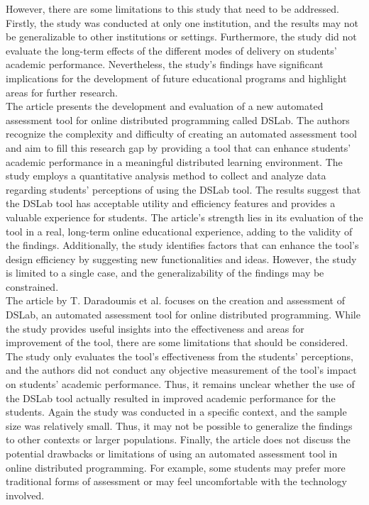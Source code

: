 However, there are some limitations to this study that need to be addressed. Firstly, the study was conducted at only one institution, and the results may not be generalizable to other institutions or settings. Furthermore, the study did not evaluate the long-term effects of the different modes of delivery on students' academic performance. Nevertheless, the study's findings have significant implications for the development of future educational programs and highlight areas for further research. \cite{fadol2018comparative}\\

The article presents the development and evaluation of a new automated assessment tool for online distributed programming called DSLab. The authors recognize the complexity and difficulty of creating an automated assessment tool and aim to fill this research gap by providing a tool that can enhance students' academic performance in a meaningful distributed learning environment. The study employs a quantitative analysis method to collect and analyze data regarding students' perceptions of using the DSLab tool. The results suggest that the DSLab tool has acceptable utility and efficiency features and provides a valuable experience for students. The article's strength lies in its evaluation of the tool in a real, long-term online educational experience, adding to the validity of the findings. Additionally, the study identifies factors that can enhance the tool's design efficiency by suggesting new functionalities and ideas. However, the study is limited to a single case, and the generalizability of the findings may be constrained.\\

The article by T. Daradoumis et al. focuses on the creation and assessment of DSLab, an automated assessment tool for online distributed programming. While the study provides useful insights into the effectiveness and areas for improvement of the tool, there are some limitations that should be considered. The study only evaluates the tool's effectiveness from the students' perceptions, and the authors did not conduct any objective measurement of the tool's impact on students' academic performance. Thus, it remains unclear whether the use of the DSLab tool actually resulted in improved academic performance for the students. Again the study was conducted in a specific context, and the sample size was relatively small. Thus, it may not be possible to generalize the findings to other contexts or larger populations. Finally, the article does not discuss the potential drawbacks or limitations of using an automated assessment tool in online distributed programming. For example, some students may prefer more traditional forms of assessment or may feel uncomfortable with the technology involved.\cite{daradoumis2019analyzing}\\

